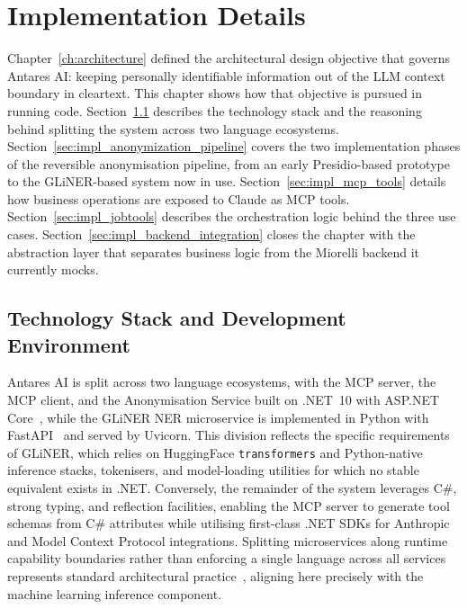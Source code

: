 \chapter{Implementation Details}
\label{ch:implementation}

Chapter~\ref{ch:architecture} defined the architectural design objective that governs Antares AI: keeping personally identifiable information out of the LLM context boundary in cleartext. This chapter shows how that objective is pursued in running code. Section~\ref{sec:impl_tech_stack} describes the technology stack and the reasoning behind splitting the system across two language ecosystems. Section~\ref{sec:impl_anonymization_pipeline} covers the two implementation phases of the reversible anonymisation pipeline, from an early Presidio-based prototype to the GLiNER-based system now in use. Section~\ref{sec:impl_mcp_tools} details how business operations are exposed to Claude as MCP tools. Section~\ref{sec:impl_jobtools} describes the orchestration logic behind the three use cases. Section~\ref{sec:impl_backend_integration} closes the chapter with the abstraction layer that separates business logic from the Miorelli backend it currently mocks.

\section{Technology Stack and Development Environment}
\label{sec:impl_tech_stack}

Antares AI is split across two language ecosystems, with the MCP server, the MCP client, and the Anonymisation Service built on .NET~10 with ASP.NET Core~\cite{dotnet10}, while the GLiNER NER microservice is implemented in Python with FastAPI~\cite{fastapi2018} and served by Uvicorn. This division reflects the specific requirements of GLiNER, which relies on HuggingFace \texttt{transformers} and Python-native inference stacks, tokenisers, and model-loading utilities for which no stable equivalent exists in .NET. Conversely, the remainder of the system leverages C\#, strong typing, and reflection facilities, enabling the MCP server to generate tool schemas from C\# attributes while utilising first-class .NET SDKs for Anthropic and Model Context Protocol integrations. Splitting microservices along runtime capability boundaries rather than enforcing a single language across all services represents standard architectural practice~\cite{newman2021building}, aligning here precisely with the machine learning inference component.

